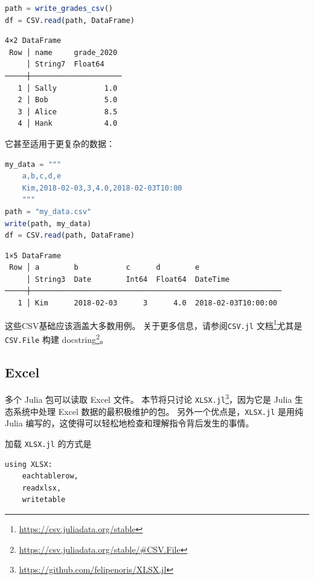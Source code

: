 \documentclass[
  notoc %
]{tufte-book}
\DeclareRobustCommand{\href}[2]{#2\footnote{\url{#1}}}
\newcommand{\passthrough}[1]{#1}
\begin{document}
\begin{lstlisting}[language=Julia]
path = write_grades_csv()
df = CSV.read(path, DataFrame)
\end{lstlisting}

\begin{lstlisting}[language=Output]
4×2 DataFrame
 Row │ name     grade_2020
     │ String7  Float64
─────┼─────────────────────
   1 │ Sally           1.0
   2 │ Bob             5.0
   3 │ Alice           8.5
   4 │ Hank            4.0
\end{lstlisting}

它甚至适用于更复杂的数据：

\begin{lstlisting}[language=Julia]
my_data = """
    a,b,c,d,e
    Kim,2018-02-03,3,4.0,2018-02-03T10:00
    """
path = "my_data.csv"
write(path, my_data)
df = CSV.read(path, DataFrame)
\end{lstlisting}

\begin{lstlisting}[language=Output]
1×5 DataFrame
 Row │ a        b           c      d        e
     │ String3  Date        Int64  Float64  DateTime
─────┼──────────────────────────────────────────────────────────
   1 │ Kim      2018-02-03      3      4.0  2018-02-03T10:00:00
\end{lstlisting}

这些CSV基础应该涵盖大多数用例。
关于更多信息，请参阅\href{https://csv.juliadata.org/stable}{\passthrough{\lstinline!CSV.jl!}
文档}尤其是\href{https://csv.juliadata.org/stable/\#CSV.File}{\passthrough{\lstinline!CSV.File!}
构建 docstring}。

\hypertarget{sec:excel}{%
\subsection{Excel}\label{sec:excel}}

多个 Julia 包可以读取 Excel 文件。 本节将只讨论
\href{https://github.com/felipenoris/XLSX.jl}{\passthrough{\lstinline!XLSX.jl!}}，因为它是
Julia 生态系统中处理 Excel 数据的最积极维护的包。
另外一个优点是，\passthrough{\lstinline!XLSX.jl!} 是用纯 Julia
编写的，这使得可以轻松地检查和理解指令背后发生的事情。

加载 \passthrough{\lstinline!XLSX.jl!} 的方式是

\begin{lstlisting}
using XLSX:
    eachtablerow,
    readxlsx,
    writetable
\end{lstlisting}
\end{document}
